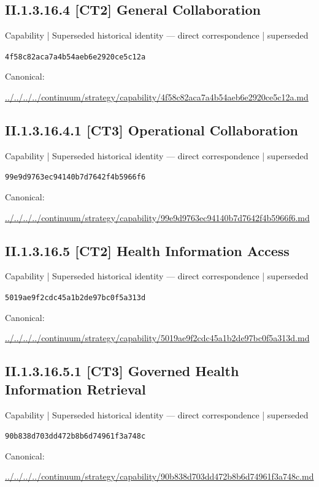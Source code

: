 \documentclass[10pt,a4paper]{article}
\begin{document}
\subsection*{II.1.3.16.4 [CT2] General Collaboration}
{\small Capability | Superseded historical identity — direct correspondence | superseded}\par
\texttt{4f58c82aca7a4b54aeb6e2920ce5c12a}\par
Canonical: \par
{\footnotesize\url{../../../../continuum/strategy/capability/4f58c82aca7a4b54aeb6e2920ce5c12a.md}}\par
\subsection*{II.1.3.16.4.1 [CT3] Operational Collaboration}
{\small Capability | Superseded historical identity — direct correspondence | superseded}\par
\texttt{99e9d9763ec94140b7d7642f4b5966f6}\par
Canonical: \par
{\footnotesize\url{../../../../continuum/strategy/capability/99e9d9763ec94140b7d7642f4b5966f6.md}}\par
\subsection*{II.1.3.16.5 [CT2] Health Information Access}
{\small Capability | Superseded historical identity — direct correspondence | superseded}\par
\texttt{5019ae9f2cdc45a1b2de97bc0f5a313d}\par
Canonical: \par
{\footnotesize\url{../../../../continuum/strategy/capability/5019ae9f2cdc45a1b2de97bc0f5a313d.md}}\par
\subsection*{II.1.3.16.5.1 [CT3] Governed Health Information Retrieval}
{\small Capability | Superseded historical identity — direct correspondence | superseded}\par
\texttt{90b838d703dd472b8b6d74961f3a748c}\par
Canonical: \par
{\footnotesize\url{../../../../continuum/strategy/capability/90b838d703dd472b8b6d74961f3a748c.md}}\par
\end{document}
